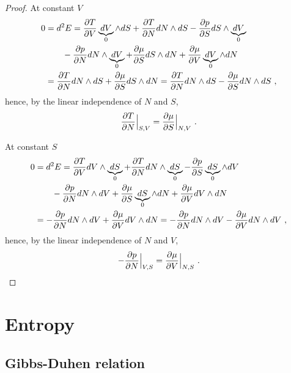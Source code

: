 \begin{proof}
        At constant $V$ 
        \begin{equation*}
        \begin{aligned}
            0 & = d^2 E = \frac{\partial T}{\partial V} \underbrace{dV}_0 \wedge dS + \frac{\partial T}{\partial N} dN \wedge dS - \frac{\partial p}{\partial S} dS \wedge \underbrace{dV}_0 \\ & \qquad - \frac{\partial p}{\partial N} dN \wedge \underbrace{dV}_0 + \frac{\partial\mu}{\partial S} dS \wedge dN + \frac{\partial\mu}{\partial V} \underbrace{dV}_0 \wedge dN \\ & = \frac{\partial T}{\partial N} dN \wedge dS + \frac{\partial\mu}{\partial S} dS \wedge dN = \frac{\partial T}{\partial N} dN \wedge dS - \frac{\partial\mu}{\partial S} dN \wedge dS~,
        \end{aligned}
        \end{equation*}
        hence, by the linear independence of $N$ and $S$,
        \begin{equation*}
            \frac{\partial T}{\partial N} \Big \vert_{S,V} = \frac{\partial\mu}{\partial S} \Big \vert_{N, V} ~.
        \end{equation*}

        At constant $S$ 
        \begin{equation*}
        \begin{aligned}
            0 & = d^2 E = \frac{\partial T}{\partial V} dV \wedge \underbrace{dS}_0 + \frac{\partial T}{\partial N} dN \wedge \underbrace{dS}_0 - \frac{\partial p}{\partial S} \underbrace{dS}_0 \wedge dV \\ & \qquad - \frac{\partial p}{\partial N} dN \wedge dV + \frac{\partial\mu}{\partial S} \underbrace{dS}_0 \wedge dN + \frac{\partial\mu}{\partial V} dV \wedge dN \\ & = - \frac{\partial p}{\partial N} dN \wedge dV + \frac{\partial\mu}{\partial V} dV \wedge dN = - \frac{\partial p}{\partial N} dN \wedge dV - \frac{\partial\mu}{\partial V} dN \wedge dV ~,
        \end{aligned}
        \end{equation*}
        hence, by the linear independence of $N$ and $V$,
        \begin{equation*}
            - \frac{\partial p}{\partial N} \Big \vert_{V,S} = \frac{\partial\mu}{\partial V} \Big \vert_{N, S} ~.
        \end{equation*}
    \end{proof}

\section{Entropy}

\subsection{Gibbs-Duhen relation}

